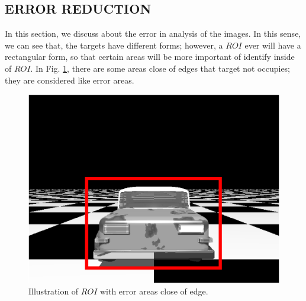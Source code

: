\subsection{ERROR REDUCTION}

In this section, we discuss about the error in analysis of the images. In this sense,
we can see that, the targets have different forms; however, 
a $ROI$ ever will have a rectangular form, so that certain areas will be more important of identify inside of $ROI$.
In Fig. \ref{fig:erroridentified}, there are some areas close of edges that target not occupies; they are
considered like error areas.

\begin{figure}[H]
\includegraphics[width=\columnwidth]{images/imageError.eps}
\caption{Illustration of $ROI$ with error areas close of edge.}
\label{fig:erroridentified}
\end{figure}

